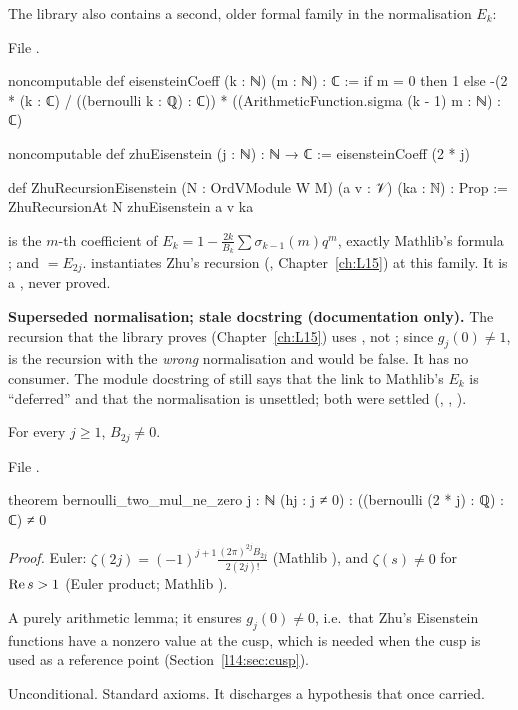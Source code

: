 The library also contains a second, older formal family in the normalisation $E_k$:

\noindent File .
\begin{leancode}
noncomputable def eisensteinCoeff (k : ℕ) (m : ℕ) : ℂ :=
  if m = 0 then 1
  else -(2 * (k : ℂ) / ((bernoulli k : ℚ) : ℂ))
        * ((ArithmeticFunction.sigma (k - 1) m : ℕ) : ℂ)

noncomputable def zhuEisenstein (j : ℕ) : ℕ → ℂ := eisensteinCoeff (2 * j)

def ZhuRecursionEisenstein (N : OrdVModule W M) (a v : 𝒱) (ka : ℕ) : Prop :=
  ZhuRecursionAt N zhuEisenstein a v ka
\end{leancode}
\begin{dictionary}
 is the $m$-th coefficient of $E_k = 1-\frac{2k}{B_k}\sum\sigma_{k-1}(m)q^m$, exactly Mathlib's
formula ; and  $=E_{2j}$. 
instantiates Zhu's recursion (, Chapter~\ref{ch:L15}) at this family. It is a , never proved.
\end{dictionary}
\begin{warning}
\textbf{Superseded normalisation; stale docstring (documentation only).} The recursion that the library proves (Chapter~\ref{ch:L15}) uses
, not ; since $g_j(0)\neq1$,  is the recursion with the
\emph{wrong} normalisation and would be false. It has no consumer. The module docstring of 
still says that the link to Mathlib's $E_k$ is ``deferred'' and that the normalisation is unsettled; both were settled
(, , ).
\end{warning}

\begin{theorem}[$B_{2j}\neq0$]\label{l14:thm:bernoulli}
For every $j\ge1$, $B_{2j}\neq0$.
\end{theorem}
\noindent File .
\begin{leancode}
theorem bernoulli_two_mul_ne_zero {j : ℕ} (hj : j ≠ 0) :
    ((bernoulli (2 * j) : ℚ) : ℂ) ≠ 0
\end{leancode}
\noindent\emph{Proof.} Euler: $\zeta(2j) = (-1)^{j+1}\frac{(2\pi)^{2j}B_{2j}}{2(2j)!}$ (Mathlib ),
and $\zeta(s)\neq0$ for $\operatorname{Re} s>1$ (Euler product; Mathlib ).
\begin{physics}
A purely arithmetic lemma; it ensures $g_j(0)\neq0$, i.e.\ that Zhu's Eisenstein functions have a nonzero value at the cusp,
which is needed when the cusp is used as a reference point (Section~\ref{l14:sec:cusp}).
\end{physics}
\begin{status}
Unconditional. Standard axioms. It discharges a hypothesis that  once carried.
\end{status}

